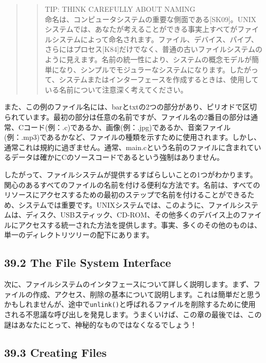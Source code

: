 \begin{quote}
\begin{quote}
TIP: THINK CAREFULLY ABOUT NAMING\\
命名は、コンピュータシステムの重要な側面である{[}SK09{]}。UNIXシステムでは、あなたが考えることができる事実上すべてがファイルシステムによって命名されます。ファイル、デバイス、パイプ、さらにはプロセス{[}K84{]}だけでなく、普通の古いファイルシステムのように見えます。名前の統一性により、システムの概念モデルが簡単になり、シンプルでモジュラーなシステムになります。したがって、システムまたはインターフェースを作成するときは、使用している名前について注意深く考えてください。
\end{quote}
\end{quote}

また、この例のファイル名には、barとtxtの2つの部分があり、ピリオドで区切られています。最初の部分は任意の名前ですが、ファイル名の2番目の部分は通常、Cコード(例：.c)であるか、画像(例：.jpg)であるか、音楽ファイル(例：.mp3)であるかなど、ファイルの種類を示すために使用されます。しかし、通常これは規約に過ぎません。通常、main.cという名前のファイルに含まれているデータは確かにCのソースコードであるという強制はありません。

したがって、ファイルシステムが提供するすばらしいことの1つがわかります。関心のあるすべてのファイルの名前を付ける便利な方法です。名前は、すべてのリソースにアクセスするための最初のステップで名前を付けることができるため、システムでは重要です。UNIXシステムでは、このように、ファイルシステムは、ディスク、USBスティック、CD-ROM、その他多くのデバイス上のファイルにアクセスする統一された方法を提供します。事実、多くのその他のものは、単一のディレクトリツリーの配下にあります。

\hypertarget{the-file-system-interface}{%
\subsection*{39.2 The File System
Interface}\label{the-file-system-interface}}

次に、ファイルシステムのインタフェースについて詳しく説明します。まず、ファイルの作成、アクセス、削除の基本について説明します。これは簡単だと思うかもしれませんが、途中で\texttt{unlink()}と呼ばれるファイルを削除するために使用される不思議な呼び出しを発見します。うまくいけば、この章の最後では、この謎はあなたにとって、神秘的なものではなくなるでしょう！

\hypertarget{creating-files}{%
\subsection*{39.3 Creating Files}\label{creating-files}}

